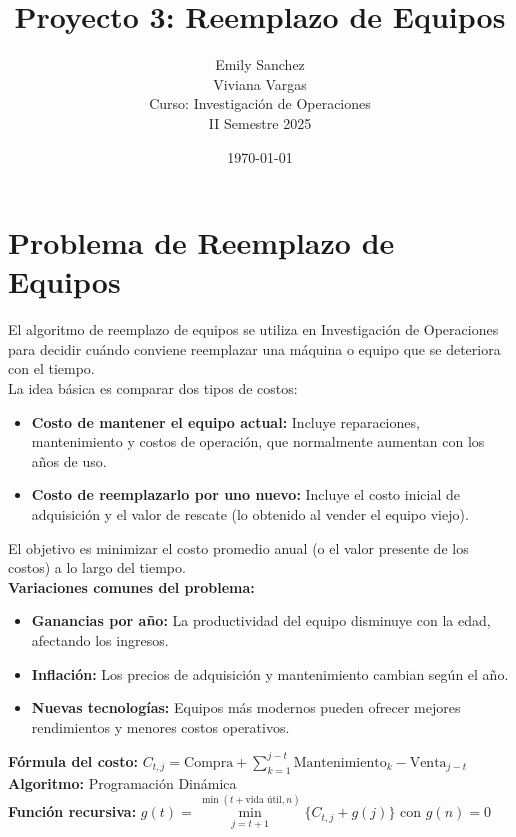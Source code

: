 \documentclass[12pt]{article}
\title{Proyecto 3: Reemplazo de Equipos}
\author{Emily Sanchez \\ Viviana Vargas \\[1cm] Curso: Investigación de Operaciones \\ II Semestre 2025}
\date{\today}
\begin{document}
\maketitle
\newpage
\section*{Problema de Reemplazo de Equipos}
El algoritmo de reemplazo de equipos se utiliza en Investigación de Operaciones para decidir cuándo conviene reemplazar una máquina o equipo que se deteriora con el tiempo.\\
La idea básica es comparar dos tipos de costos:\\
\begin{itemize}
\item \textbf{Costo de mantener el equipo actual:} Incluye reparaciones, mantenimiento y costos de operación, que normalmente aumentan con los años de uso.\\
\item \textbf{Costo de reemplazarlo por uno nuevo:} Incluye el costo inicial de adquisición y el valor de rescate (lo obtenido al vender el equipo viejo).\\
\end{itemize}
El objetivo es minimizar el costo promedio anual (o el valor presente de los costos) a lo largo del tiempo.\\
\textbf{Variaciones comunes del problema:}\\
\begin{itemize}
\item \textbf{Ganancias por año:} La productividad del equipo disminuye con la edad, afectando los ingresos.\\
\item \textbf{Inflación:} Los precios de adquisición y mantenimiento cambian según el año.\\
\item \textbf{Nuevas tecnologías:} Equipos más modernos pueden ofrecer mejores rendimientos y menores costos operativos.\\
\end{itemize}
\textbf{Fórmula del costo:} $C_{t,j} = \text{Compra} + \sum_{k=1}^{j-t} \text{Mantenimiento}_k - \text{Venta}_{j-t}$\\
\textbf{Algoritmo:} Programación Dinámica \\
\textbf{Función recursiva:} $g(t) = \min\limits_{j=t+1}^{\min(t+\text{vida útil}, n)} \{C_{t,j} + g(j)\}$ con $g(n) = 0$\\
\end{document}
